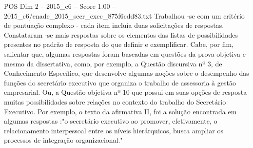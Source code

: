 \begin{textsample}{POS Dim 2 – 2015\_c6 – Score 1.00 – 2015\_c6/enade\_2015\_secr\_exec\_875f6cdd83.txt}
Trabalhou -se com um critério de pontuação complexo - cada item incluía duas solicitações de respostas.
Constataram -se mais respostas sobre os elementos das listas de possibilidades presentes no padrão de resposta do que definir e exemplificar.
Cabe, por fim, salientar que, algumas respostas foram baseadas em questões da prova objetiva e mesmo da dissertativa, como, por exemplo, a Questão discursiva nº 3, de Conhecimento Específico, que desenvolve algumas noções sobre o desempenho das funções do secretário executivo que organiza o trabalho de assessoria à gestão empresarial.
Ou, a Questão objetiva nº 10 que possui em suas opções de resposta muitas possibilidades sobre relações no contexto do trabalho do Secretário Executivo.
Por exemplo, o texto da afirmativa II, foi a solução encontrada em algumas respostas :"o secretário executivo ao promover, efetivamente, o relacionamento interpessoal entre os níveis hierárquicos, busca ampliar os processos de integração organizacional."

\end{textsample}
